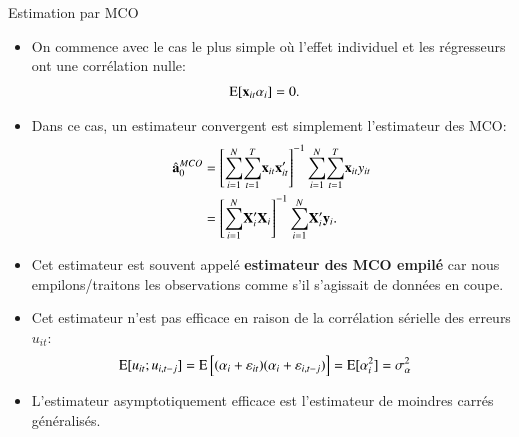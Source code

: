 \begin{frame}[allowframebreaks]{Estimation par MCO}
\begin{itemize}
    \item On commence avec le cas le plus simple où l'effet individuel 
    et les régresseurs ont une corrélation nulle:
    \begin{align*}
        \operatorname{E}[{\mathbf x}_{it}\alpha_i] &= 0.
    \end{align*}
    \item Dans ce cas, un estimateur convergent est simplement l'estimateur des MCO:
    \begin{align*}
    \hat{{\mathbf a}}_0^{MCO} &= \left[{\sum_{i=1}^N}{\sum_{t=1}^T} {\mathbf x}_{it}{\mathbf x}_{it}^\prime\right]^{-1}{\sum_{i=1}^N}{\sum_{t=1}^T} {\mathbf x}_{it}y_{it}\\
               &= \left[{\sum_{i=1}^N} \mathbf X_i^\prime \mathbf X_i\right]^{-1}{\sum_{i=1}^N} \mathbf X_i^\prime {\mathbf y}_i.
    \end{align*}
    \item Cet estimateur est souvent appelé \textbf{estimateur des MCO empilé} car nous empilons/traitons
     les observations comme s'il s'agissait de données en coupe.
     \item Cet estimateur n'est pas efficace en raison de la corrélation sérielle des erreurs $u_{it}$:
     \begin{align*}
        \operatorname{E}[u_{it}; u_{i, t-j}] &= \operatorname{E}\left[(\alpha_i + \varepsilon_{it})(\alpha_i + \varepsilon_{i, t-j})\right] = \operatorname{E}[\alpha_i^2] =\sigma_\alpha^2
    \end{align*}
    \item L'estimateur asymptotiquement efficace est l'estimateur de moindres carrés généralisés.
\end{itemize}
\end{frame}

